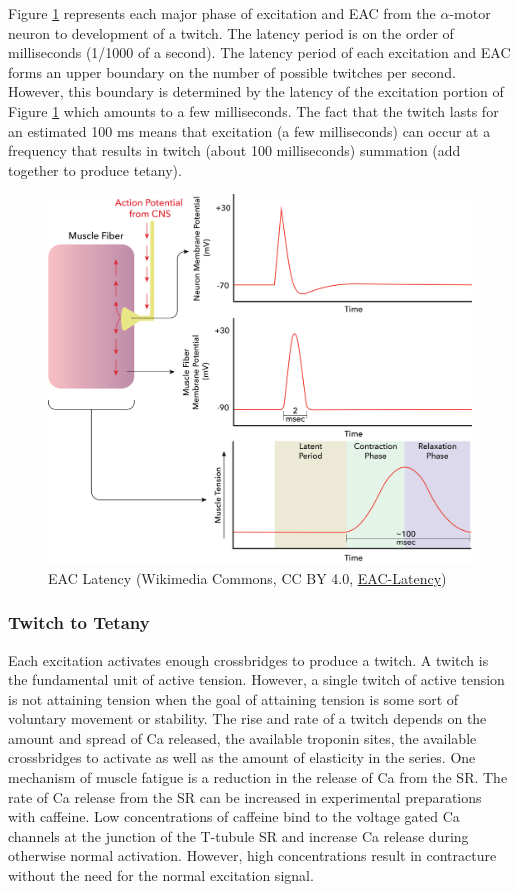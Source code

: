 Figure \ref{fig:eac-latency} represents each major phase of excitation and EAC from the $\alpha$-motor neuron to development of a twitch. The latency period is on the order of milliseconds (1/1000 of a second). The latency period of each excitation and EAC forms an upper boundary on the number of possible twitches per second. However, this boundary is determined by the latency of the excitation portion of Figure \ref{fig:eac-latency} which amounts to a few milliseconds. The fact that the twitch lasts for an estimated 100 ms means that excitation (a few milliseconds) can occur at a frequency that results in twitch (about 100 milliseconds) summation (add together to produce tetany).
\begin{figure}[!ht]
    \centering
    \includegraphics[width=1\linewidth]{./figure/eac-latency.png}
    \caption{EAC Latency \footnotesize{(Wikimedia Commons, CC BY 4.0, \href{https://commons.wikimedia.org/wiki/File:The_latent_period_between_the_muscle_action_potential_and_contraction.png}{EAC-Latency})}}
    \label{fig:eac-latency}
\end{figure}

\subsubsection{Twitch to Tetany}
Each excitation activates enough crossbridges to produce a twitch. A twitch is the fundamental unit of active tension. However, a single twitch of active tension is not attaining tension when the goal of attaining tension is some sort of voluntary movement or stability. The rise and rate of a twitch depends on the amount and spread of Ca released, the available troponin sites, the available crossbridges to activate as well as the amount of elasticity in the series. One mechanism of muscle fatigue is a reduction in the release of Ca from the SR. The rate of Ca release from the SR can be increased in experimental preparations with caffeine. Low concentrations of caffeine bind to the voltage gated Ca channels at the junction of the T-tubule SR and increase Ca release during otherwise normal activation. However, high concentrations result in contracture without the need for the normal excitation signal. 

